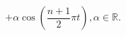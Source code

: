 \documentclass[a4paper,12pt,oneside]{report}
\begin{document}
\begin{enumerate}
		      	\begin{displaymath}
		      		+ \alpha  \cos \left ( \frac{n+1}{2} \pi t \right ), \alpha \in \mathbb{R}. 
		      	\end{displaymath}
		      			      	
		      			      			      	
		      			      			      			      			      	    
		      	\end{enumerate}
		      			      			      			      		    	
		      	
		      	\setlength{\baselineskip}{\normalbaselineskip}
		      	\setlength{\parskip}{0pt}
		      	
\end{document}
